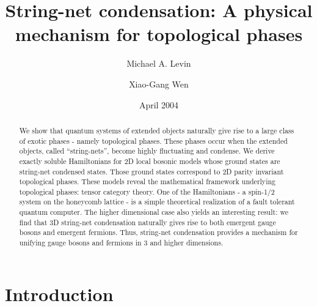 \documentclass[aps,twocolumn,groupedaddress,showpacs,floatfix]{revtex4}
\begin{document}



\title{String-net condensation: A physical mechanism for topological phases}

\author{Michael A. Levin}
\author{Xiao-Gang Wen}
\date{April 2004}

\begin{abstract}
We show that quantum systems of extended objects naturally give rise to a
large class of exotic phases - namely topological phases. These phases occur
when the extended objects, called ``string-nets'', become highly fluctuating
and condense. We derive exactly soluble Hamiltonians for 2D local bosonic
models whose ground states are string-net condensed states. Those ground
states correspond to 2D parity invariant topological phases. These models
reveal the mathematical framework underlying topological phases: tensor
category theory. One of the Hamiltonians - a spin-1/2 system on the honeycomb
lattice - is a simple theoretical realization of a fault tolerant quantum
computer. The higher dimensional case also yields an interesting result: we
find that 3D string-net condensation naturally gives rise to both emergent
gauge bosons and emergent fermions. Thus, string-net condensation provides a
mechanism for unifying gauge bosons and fermions in 3 and higher dimensions.
\end{abstract}

\maketitle

\section{Introduction}
\end{document}
